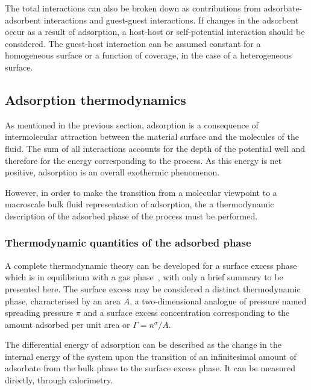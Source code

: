 The total interactions can also be broken down as contributions
from adsorbate-adsorbent interactions and guest-guest interactions.
If changes in the adsorbent occur as a result of adsorption,
a host-host or self-potential interaction should be considered.
The guest-host interaction can be assumed constant for a homogeneous
surface or a function of coverage, in the case of a
heterogeneous surface.

\subsection{Adsorption thermodynamics}

As mentioned in the previous section, adsorption
is a consequence of intermolecular attraction between the
material surface and the molecules of the fluid. The sum of
all interactions accounts for the depth of the potential
well and therefore for the energy corresponding to the
process. As this energy is net positive, adsorption is an
overall exothermic phenomenon.

However, in order to make the transition from a molecular
viewpoint to a macroscale bulk fluid representation of
adsorption, the a thermodynamic description of the adsorbed
phase of the process must be performed.

\subsubsection{Thermodynamic quantities of the adsorbed phase}

A complete thermodynamic theory can be developed for a surface 
excess phase which is in equilibrium with a gas 
phase~\cite{rouquerolAdsorptionPowdersPorous2013}, with only
a brief summary to be presented here.
The surface excess may be considered a distinct thermodynamic phase, 
characterised by an area \(A\), a two-dimensional analogue of 
pressure named spreading pressure \(\pi\) and a surface excess 
concentration corresponding to the amount adsorbed per unit
area or \(\Gamma = n^{\sigma}/A\).

The differential energy of adsorption can be described as the 
change in the internal energy of the system upon the transition
of an infinitesimal amount of adsorbate from the bulk phase
to the surface excess phase. It can be measured directly, through
calorimetry.

